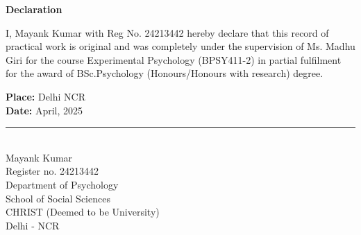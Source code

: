 \documentclass[12pt]{article}
\newcommand{\Name}{Mayank Kumar }
\newcommand{\RollNo}{24213442 }
\newcommand{\Date}{April, 2025 }
\newcommand{\Teacher}{Ms. Madhu Giri }
\begin{document}
\newpage
\begin{titlepage}
    \begin{center}
        {\Large \bfseries Declaration}
    \end{center}
    \vskip 0.5cm
    {I, \Name with Reg No. \RollNo  hereby declare that this record of practical work is original and was completely under the supervision of \Teacher for the course Experimental Psychology (BPSY411-2) in partial fulfilment for the award of BSc.Psychology (Honours/Honours with research) degree.}

    \vskip 0.5in
    {\noindent\textbf{Place:} Delhi NCR \\ \textbf{Date:} \Date}
    \vskip 0.5in
    \begin{flushright}
    \noindent\rule{0.4\linewidth}{0.4pt} \\ \Name \\ Register no. \RollNo \\ Department of Psychology \\ School of Social Sciences \\ CHRIST (Deemed to be University) \\ Delhi - NCR
    \end{flushright}
\end{titlepage}
\end{document}
